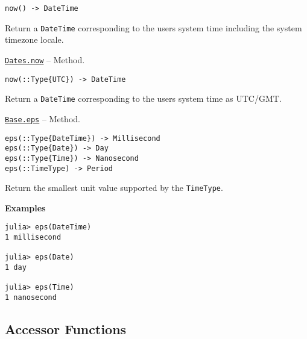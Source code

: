 \begin{adjustwidth}{2em}{0pt}


\begin{verbatim}
now() -> DateTime
\end{verbatim}

Return a \texttt{DateTime} corresponding to the user{\textquotesingle}s system time including the system timezone locale.



\end{adjustwidth}
\hypertarget{14867142023322691223}{}
\hyperlink{14867142023322691223}{\texttt{Dates.now}}  -- {Method.}

\begin{adjustwidth}{2em}{0pt}


\begin{verbatim}
now(::Type{UTC}) -> DateTime
\end{verbatim}

Return a \texttt{DateTime} corresponding to the user{\textquotesingle}s system time as UTC/GMT.



\end{adjustwidth}
\hypertarget{15228531075982496551}{}
\hyperlink{15228531075982496551}{\texttt{Base.eps}}  -- {Method.}

\begin{adjustwidth}{2em}{0pt}


\begin{verbatim}
eps(::Type{DateTime}) -> Millisecond
eps(::Type{Date}) -> Day
eps(::Type{Time}) -> Nanosecond
eps(::TimeType) -> Period
\end{verbatim}

Return the smallest unit value supported by the \texttt{TimeType}.

\textbf{Examples}


\begin{verbatim}
julia> eps(DateTime)
1 millisecond

julia> eps(Date)
1 day

julia> eps(Time)
1 nanosecond
\end{verbatim}



\end{adjustwidth}

\hypertarget{1191060472934000044}{}


\subsection{Accessor Functions}


